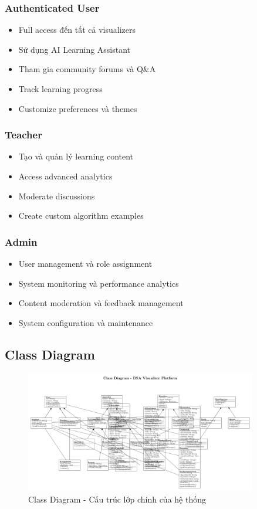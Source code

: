 \documentclass[12pt,a4paper]{article}
\begin{document}
\subsubsection{Authenticated User}
\begin{itemize}
    \item Full access đến tất cả visualizers
    \item Sử dụng AI Learning Assistant
    \item Tham gia community forums và Q\&A
    \item Track learning progress
    \item Customize preferences và themes
\end{itemize}

\subsubsection{Teacher}
\begin{itemize}
    \item Tạo và quản lý learning content
    \item Access advanced analytics
    \item Moderate discussions
    \item Create custom algorithm examples
\end{itemize}

\subsubsection{Admin}
\begin{itemize}
    \item User management và role assignment
    \item System monitoring và performance analytics
    \item Content moderation và feedback management
    \item System configuration và maintenance
\end{itemize}

\subsection{Class Diagram}

\begin{figure}[H]
\centering
\includegraphics[width=0.9\textwidth]{diagrams/class_diagram.pdf}
\caption{Class Diagram - Cấu trúc lớp chính của hệ thống}
\label{fig:class_diagram}
\end{figure}
\end{document}
